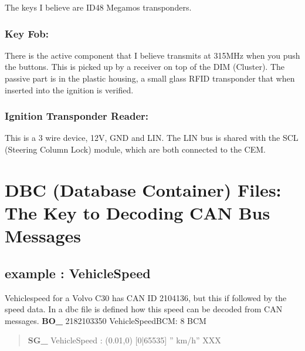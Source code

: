 \documentclass[letterpaper,10pt,english]{sphinxmanual}
\begin{document}
\sphinxAtStartPar
The keys I believe are ID48 Megamos transponders.


\subsection{Key Fob:}
\label{\detokenize{hacking/keys:key-fob}}
\sphinxAtStartPar
There is the active component that I believe transmits at 315MHz when you push the buttons. This is picked up by a receiver on top of the DIM (Cluster). The passive part is in the plastic housing, a small glass RFID transponder that when inserted into the ignition is verified.

\noindent{}

\noindent{}


\subsection{Ignition Transponder Reader:}
\label{\detokenize{hacking/keys:ignition-transponder-reader}}
\sphinxAtStartPar
This is a 3 wire device, 12V, GND and LIN. The LIN bus is shared with the SCL (Steering Column Lock) module, which are both connected to the CEM.

\noindent{}


\chapter{DBC (Database Container) Files: The Key to Decoding CAN Bus Messages}
\label{\detokenize{dbc:dbc-database-container-files-the-key-to-decoding-can-bus-messages}}\label{\detokenize{dbc::doc}}
\sphinxAtStartPar
{}


\section{example : VehicleSpeed}
\label{\detokenize{dbc:example-vehiclespeed}}
\sphinxAtStartPar
Vehiclespeed for a Volvo C30 has CAN ID 2104136, but this if followed by the speed data. In a dbc file is defined how this speed can be decoded from CAN messages.
{\color{red}\bfseries{}BO\_} 2182103350 VehicleSpeedBCM: 8 BCM
\begin{quote}

\sphinxAtStartPar
{\color{red}\bfseries{}SG\_} VehicleSpeed :  (0.01,0) {[}0|65535{]} ” km/h” XXX
\end{quote}
\end{document}
